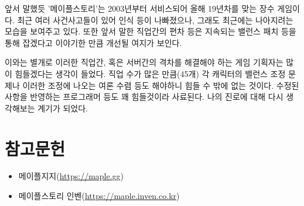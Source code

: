 \documentclass[
]{article}
\begin{document}
앞서 말했듯 '메이플스토리'는 2003년부터 서비스되어 올해 19년차를 맞는
장수 게임이다. 최근 여러 사건사고들이 있어 인식 등이 나빠졌으나, 그래도
최근에는 나아지려는 모습을 보여주고 있다. 또한 앞서 말한 직업간의 편차
등은 지속되는 밸런스 패치 등을 통해 잡겠다고 이야기한 만큼 개선될 여지가
보인다.

이와는 별개로 이러한 직업간, 혹은 서버간의 격차를 해결해야 하는 게임
기획자는 많이 힘들겠다는 생각이 들었다. 직업 수가 많은 만큼(45개) 각
캐릭터의 밸런스 조정 문제나 이러한 조정에 나오는 여론 수렴 등도 해야하니
힘들 수 밖에 없는 것이다. 수정된 사항을 반영하는 프로그래머 등도 꽤
힘들것이라 사료된다. 나의 진로에 대해 다시 생각해보는 계기가 되었다.

\hypertarget{uxcc38uxace0uxbb38uxd5cc}{%
\section{참고문헌}\label{uxcc38uxace0uxbb38uxd5cc}}

\begin{itemize}
\item
  메이플지지(\url{https://maple.gg})
\item
  메이플스토리 인벤(\url{https://maple.inven.co.kr})
\end{itemize}
\end{document}
